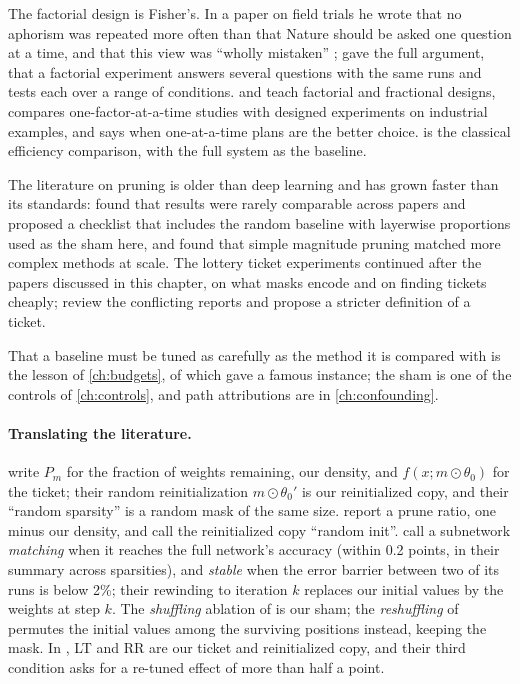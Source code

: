 \begin{refsection}
\notesandrefs
The factorial design is Fisher's. In a paper on field trials he wrote that no aphorism was repeated more often than that Nature should be asked one question at a time, and that this view was \enquote{wholly mistaken} \parencite[p.~511]{Fisher1926}; \textcite{Fisher1935} gave the full argument, that a factorial experiment answers several questions with the same runs and tests each over a range of conditions. \Textcite{BoxHunterHunter2005} and \textcite{Montgomery2017} teach factorial and fractional designs, \textcite{Czitrom1999} compares one-factor-at-a-time studies with designed experiments on industrial examples, and \textcite{Daniel1973} says when one-at-a-time plans are the better choice.  is the classical efficiency comparison, with the full system as the baseline.

The literature on pruning is older than deep learning \parencite{LeCunDenkerSolla1990} and has grown faster than its standards: \textcite{BlalockEtAl2020} found that results were rarely comparable across papers and proposed a checklist that includes the random baseline with layerwise proportions used as the sham here, and \textcite{GaleElsenHooker2019} found that simple magnitude pruning matched more complex methods at scale. The lottery ticket experiments continued after the papers discussed in this chapter, on what masks encode and on finding tickets cheaply; \textcite{MaEtAl2021} review the conflicting reports and propose a stricter definition of a ticket.

That a baseline must be tuned as carefully as the method it is compared with is the lesson of \cref{ch:budgets}, of which \textcite{MelisDyerBlunsom2018} gave a famous instance; the sham is one of the controls of \cref{ch:controls}, and path attributions are in \cref{ch:confounding}.

\paragraph{Translating the literature.} \Textcite{FrankleCarbin2019} write $P_m$ for the fraction of weights remaining, our density, and $f(x;m\odot\theta_0)$ for the ticket; their random reinitialization $m\odot\theta_0'$ is our reinitialized copy, and their ``random sparsity'' is a random mask of the same size. \Textcite{LiuEtAl2019} report a prune ratio, one minus our density, and call the reinitialized copy ``random init''. \Textcite{FrankleEtAl2020} call a subnetwork \emph{matching} when it reaches the full network's accuracy (within 0.2 points, in their summary across sparsities), and \emph{stable} when the error barrier between two of its runs is below 2\%; their rewinding to iteration $k$ replaces our initial values by the weights at step $k$. The \emph{shuffling} ablation of \textcite{FrankleEtAl2021} is our sham; the \emph{reshuffling} of \textcite{ZhouEtAl2019} permutes the initial values among the surviving positions instead, keeping the mask. In \textcite{MaEtAl2021}, LT and RR are our ticket and reinitialized copy, and their third condition asks for a re-tuned effect of more than half a point.

\printchapterbib
\end{refsection}
